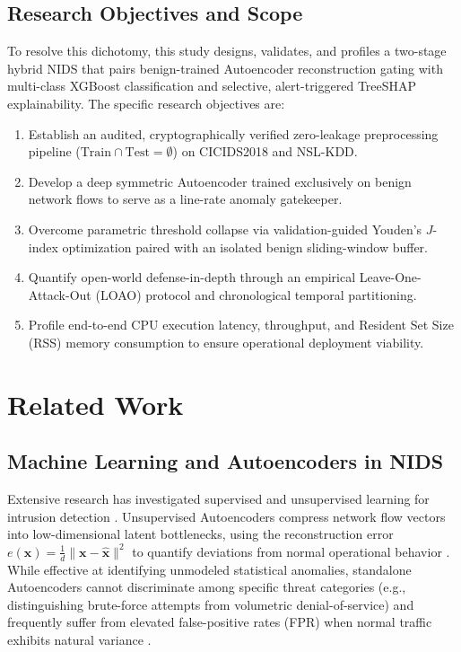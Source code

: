\documentclass[journal]{IEEEtran}
\begin{document}
\subsection{Research Objectives and Scope}
To resolve this dichotomy, this study designs, validates, and profiles a two-stage hybrid NIDS that pairs benign-trained Autoencoder reconstruction gating with multi-class XGBoost classification and selective, alert-triggered TreeSHAP explainability. The specific research objectives are:
\begin{enumerate}
\item Establish an audited, cryptographically verified zero-leakage preprocessing pipeline ($\text{Train} \cap \text{Test} = \emptyset$) on CICIDS2018 and NSL-KDD.
\item Develop a deep symmetric Autoencoder trained exclusively on benign network flows to serve as a line-rate anomaly gatekeeper.
\item Overcome parametric threshold collapse via validation-guided Youden's $J$-index optimization paired with an isolated benign sliding-window buffer.
\item Quantify open-world defense-in-depth through an empirical Leave-One-Attack-Out (LOAO) protocol and chronological temporal partitioning.
\item Profile end-to-end CPU execution latency, throughput, and Resident Set Size (RSS) memory consumption to ensure operational deployment viability.
\end{enumerate}

\section{Related Work}

\subsection{Machine Learning and Autoencoders in NIDS}
Extensive research has investigated supervised and unsupervised learning for intrusion detection \cite{diana2025,ahmed2026,sowmya2023}. Unsupervised Autoencoders compress network flow vectors into low-dimensional latent bottlenecks, using the reconstruction error $e(\mathbf{x}) = \frac{1}{d}\|\mathbf{x}-\hat{\mathbf{x}}\|^2$ to quantify deviations from normal operational behavior \cite{abdallah2024,shree2025}. While effective at identifying unmodeled statistical anomalies, standalone Autoencoders cannot discriminate among specific threat categories (e.g., distinguishing brute-force attempts from volumetric denial-of-service) and frequently suffer from elevated false-positive rates (FPR) when normal traffic exhibits natural variance \cite{hussein2026,kamal2026}.
\end{document}
